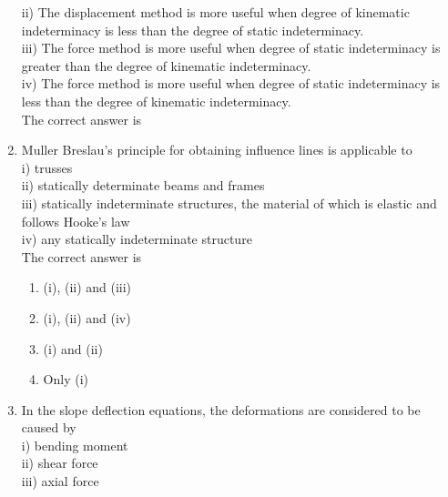 \documentclass[11pt,a4paper]{article}
\begin{document}
\begin{enumerate}
{ii) The displacement method is more useful when degree of kinematic indeterminacy is less than the degree of static indeterminacy. \\
iii) The force method is more useful when degree of static indeterminacy is greater than the degree of kinematic indeterminacy. \\
iv) The force method is more useful when degree of static indeterminacy is less than the degree of kinematic indeterminacy. \\
The correct answer is}
\\
\item{Muller Breslau's principle for obtaining influence lines is applicable to \\
i) trusses \\
ii) statically determinate beams and frames \\
iii) statically indeterminate structures, the material of which is elastic and follows Hooke's law \\
iv) any statically indeterminate structure \\
The correct answer is
}
\begin{enumerate}[label=\Alph*.]
\item{(i), (ii) and (iii)}
\item{(i), (ii) and (iv)}
\item{(i) and (ii)}
\item{Only (i)}
\end{enumerate}
\item{In the slope deflection equations, the deformations are considered to be caused by \\

i) bending moment \\

ii) shear force \\

iii) axial force \\

}
\end{enumerate}
\end{document}
